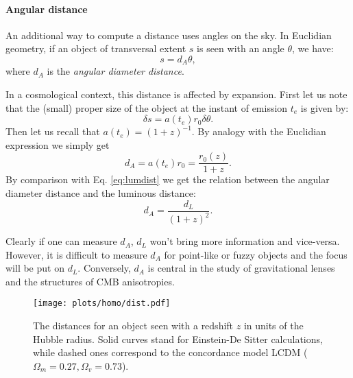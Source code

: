 \paragraph{Angular distance} %
\label{par:angular_distance}
An additional way to compute a distance uses angles on the sky. In Euclidian geometry, if an object of transversal extent $s$ is seen with an angle $\theta$, we have:
\begin{equation}
	s=d_A\theta,
\end{equation} 
where $d_A$ is the \emph{angular diameter distance}.

In a cosmological context, this distance is affected by expansion. First let us note that the (small) proper size of the object at the instant of emission $t_e$ is given by:
\begin{equation}
	\delta s=a(t_e)r_0\delta\theta.
\end{equation}
Then let us recall that $a(t_e)=(1+z)^{-1}$. By analogy with the Euclidian expression we simply get
\begin{equation}
	d_A=a(t_e)r_0=\frac{r_0(z)}{1+z}.
\end{equation}
By comparison with Eq. \ref{eq:lumdist} we get the relation between the angular diameter distance and the luminous distance:
\begin{equation}
	d_A=\frac{d_L}{(1+z)^2}.
\end{equation}

Clearly if one can measure $d_A$, $d_L$ won't bring more information and vice-versa. However, it is difficult to measure $d_A$ for point-like or fuzzy objects and the focus will be put on $d_L$. Conversely, $d_A$ is central in the study of gravitational lenses and the structures of CMB anisotropies.
\begin{figure}[htbp]
	\centering
		\texttt{[image: plots/homo/dist.pdf]}
	\caption{The distances for an object seen with a redshift $z$ in units of the Hubble radius. Solid curves stand for Einstein-De Sitter calculations, while dashed ones correspond to the concordance model LCDM ($\Omega_m=0.27, \Omega_v=0.73$).}
	\label{fig:plots_homo_dist}
\end{figure}


